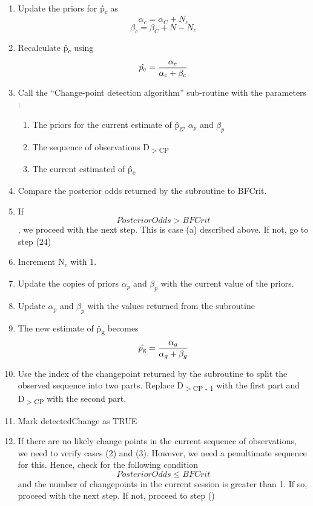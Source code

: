 \documentclass{article}
\begin{document}
\begin{enumerate}
\item Update the priors for \^{p\textsubscript{c}} as
\[ \alpha_c = \alpha_C + N_c\]
\[ \beta_c = \beta_C + N - N_c\]

\item Recalculate \^{p\textsubscript{c}} using
\[ \hat{p\textsubscript{c}} = \frac{\alpha_c}{\alpha_c + \beta_c} \]

\item Call the ``Change-point detection algorithm'' sub-routine with the parameters :
	\begin{enumerate}
		\item The priors for the current estimate of \^{p\textsubscript{g}}, $\alpha_p$ and $\beta_p$
		\item The sequence of observations D\textsubscript{$>$CP}
		\item The current estimated  of \^{p\textsubscript{c}}
	\end{enumerate}

\item Compare the posterior odds returned by the subroutine to BFCrit. 

\item If \[ Posterior Odds > BFCrit \], we proceed with the next step. This is case (a) described above. If not, go to step (24)

\item Increment N\textsubscript{c} with 1.

\item Update the copies of priors $\alpha_p$ and $\beta_p$ with the current value of the priors.

\item Update $\alpha_p$ and $\beta_p$ with the values returned from the subroutine

\item The new estimate of \^{p\textsubscript{g}} becomes \[ \hat{p\textsubscript{g}} = \frac{\alpha_g}{\alpha_g + \beta_g} \]

\item Use the index of the changepoint returned by the subroutine to split the observed sequence into two parts. Replace D\textsubscript{$>$CP - 1} with the first part and D\textsubscript{$>$CP} with the second part.

\item Mark detectedChange as TRUE

\item If there are no likely change points in the current sequence of observations, we need to verify cases (2) and (3). However, we need a penultimate sequence for this. Hence, check for the following condition
\[ Posterior Odds \leq BFCrit  \] and the number of changepoints in the current session is greater than 1. If so, proceed with the next step. If not, proceed to step ()


\end{enumerate}
\end{document}

